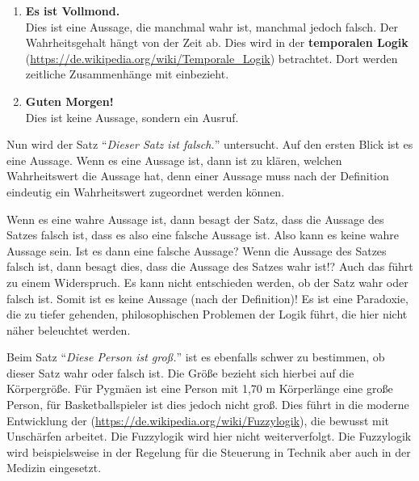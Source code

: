 \begin{Unit}[Beispiele]
\begin{enumerate}
\item \textbf{Es ist Vollmond.} \\
Dies ist eine Aussage, die manchmal wahr ist, manchmal jedoch falsch. Der
Wahrheitsgehalt hängt von der Zeit ab. Dies wird in der \textbf{temporalen 
Logik} 
(\url{https://de.wikipedia.org/wiki/Temporale_Logik}) betrachtet. Dort werden
zeitliche Zusammenhänge mit einbezieht.

\item \textbf{Guten Morgen!}\\
Dies ist keine Aussage, sondern ein Ausruf.
\end{enumerate}
\end{Unit}

\begin{Unit}[Diskussion]
Nun wird der Satz \enquote{\emph{Dieser Satz ist falsch.}} untersucht. Auf 
den ersten Blick ist es eine Aussage. Wenn es eine Aussage ist, dann ist zu 
klären, welchen Wahrheitswert die Aussage hat, denn einer Aussage muss nach 
der Definition eindeutig ein Wahrheitswert zugeordnet werden können. 

Wenn es eine wahre Aussage ist, dann besagt der Satz, dass die Aussage des 
Satzes falsch ist, dass es also eine falsche Aussage ist. Also kann es keine 
wahre Aussage sein. Ist es dann eine falsche Aussage? Wenn die Aussage des 
Satzes falsch ist, dann besagt dies, dass die Aussage des Satzes wahr ist!? 
Auch das führt zu einem Widerspruch. Es kann nicht entschieden werden, ob der 
Satz wahr oder falsch ist. Somit ist es keine Aussage (nach der Definition)! 
Es ist eine Paradoxie, die zu tiefer gehenden, philosophischen Problemen der 
Logik führt, die hier nicht näher beleuchtet werden.
\end{Unit}

\begin{Unit}[Diskussion] 
Beim Satz \enquote{\emph{Diese Person ist groß.}} ist es ebenfalls schwer zu
bestimmen, ob dieser Satz wahr oder falsch ist. Die Größe bezieht sich hierbei 
auf die Körpergröße. Für Pygmäen ist eine Person mit 1,70 m Körperlänge eine 
große Person, für Basketballspieler ist dies jedoch nicht groß. Dies führt in 
die moderne Entwicklung der  
(\url{https://de.wikipedia.org/wiki/Fuzzylogik}), die bewusst mit Unschärfen
arbeitet. Die Fuzzylogik wird hier nicht weiterverfolgt. Die Fuzzylogik wird
beispielsweise in der Regelung für die Steuerung in Technik aber auch in der 
Medizin eingesetzt.
\end{Unit}

